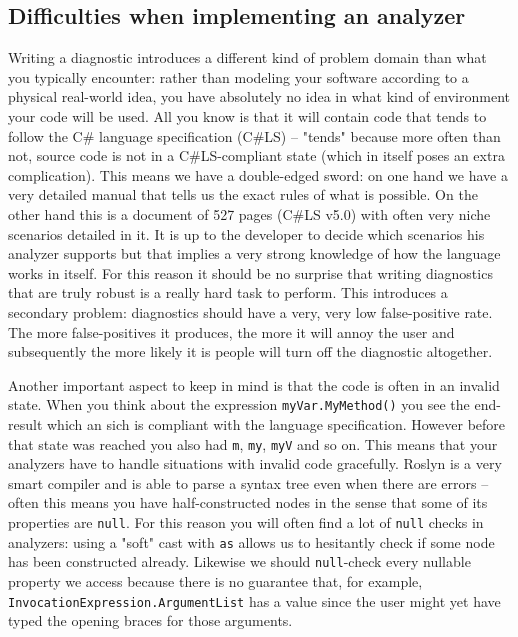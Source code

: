 \subsection{Difficulties when implementing an analyzer}
\label{sec:diagnostic-difficulties}

Writing a diagnostic introduces a different kind of problem domain than what you typically encounter: rather than modeling your software according to a physical real-world idea, you have absolutely no idea in what kind of environment your code will be used. All you know is that it will contain code that tends to follow the C\# language specification (C\#LS) -- "tends" because more often than not, source code is not in a C\#LS-compliant state (which in itself poses an extra complication). 
This means we have a double-edged sword: on one hand we have a very detailed manual that tells us the exact rules of what is possible. On the other hand this is a document of 527 pages (C\#LS v5.0) with often very niche scenarios detailed in it. It is up to the developer to decide which scenarios his analyzer supports but that implies a very strong knowledge of how the language works in itself. For this reason it should be no surprise that writing diagnostics that are truly robust is a really hard task to perform. This introduces a secondary problem: diagnostics should have a very, very low false-positive rate. The more false-positives it produces, the more it will annoy the user and subsequently the more likely it is people will turn off the diagnostic altogether.

Another important aspect to keep in mind is that the code is often in an invalid state. When you think about the expression \texttt{myVar.MyMethod()} you see the end-result which an sich is compliant with the language specification. However before that state was reached you also had \texttt{m}, \texttt{my}, \texttt{myV} and so on. This means that your analyzers have to handle situations with invalid code gracefully. Roslyn is a very smart compiler and is able to parse a syntax tree even when there are errors -- often this means you have half-constructed nodes in the sense that some of its properties are \texttt{null}. For this reason you will often find a lot of \texttt{null} checks in analyzers: using a "soft" cast with \texttt{as} allows us to hesitantly check if some node has been constructed already. Likewise we should \texttt{null}-check every nullable property we access because there is no guarantee that, for example, \texttt{InvocationExpression.ArgumentList} has a value since the user might yet have typed the opening braces for those arguments.

